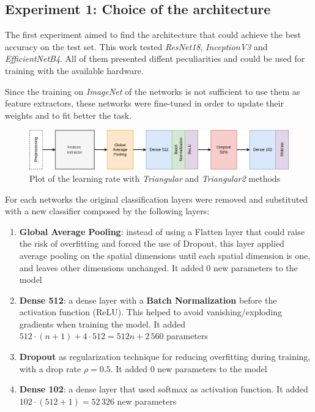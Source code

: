 \subsection{Experiment 1: Choice of the architecture}\label{sec:exp1}
The first experiment aimed to find the architecture that could achieve the best accuracy on the test set. This work tested \textit{ResNet18}, \textit{InceptionV3} and 
\textit{EfficientNetB4}. All of them presented diffent peculiarities and could be used for training with the available hardware. \par
Since the training on \textit{ImageNet} of the networks is not sufficient to use them as feature extractors, these networks were fine-tuned in order to update their weights and to fit better the task.
\begin{figure}[ht!]
\centering
\includegraphics[width=1\textwidth]{images/architecture.png} 
\caption{Plot of the learning rate with \emph{Triangular} and \emph{Triangular2} methods}
\label{fig:architecture}
\end{figure}
For each networks the original classification layers were removed and substituted with a new classifier composed by the following layers:
\begin{enumerate}
\item{\textbf{Global Average Pooling}: instead of using a Flatten layer that could raise the risk of overfitting and forced the use of Dropout, this layer applied average pooling on the spatial dimensions until each spatial dimension is one, and leaves other dimensions unchanged. It added 0 new parameters to the model} 
\item{\textbf{Dense 512}: a dense layer with a \textbf{Batch Normalization} before the activation function (ReLU). This helped to avoid vanishing/exploding gradients when training the model. It added $512 \cdot (n+1) + 4\cdot512 = 512n + 2\,560$ parameters}
\item{\textbf{Dropout} as regularization technique for reducing overfitting during training, with a drop rate $\rho=0.5$. It added 0 new parameters to the model}
\item{\textbf{Dense 102}: a dense layer that used softmax as activation function. It added  $102 \cdot (512+1) = 52\,326$ new parameters}
\end{enumerate}

